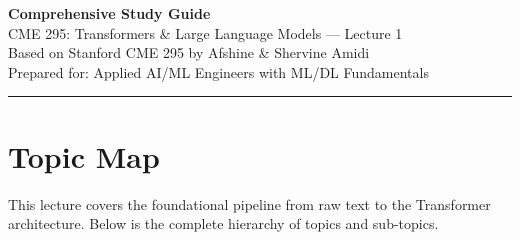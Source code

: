 \documentclass[11pt, a4paper]{article}
\begin{document}
\begin{center}
{\LARGE\bfseries\color{defblue} Comprehensive Study Guide}\\[6pt]
{\Large CME 295: Transformers \& Large Language Models --- Lecture 1}\\[4pt]
{\normalsize Based on Stanford CME 295 by Afshine \& Shervine Amidi}\\[4pt]
{\small Prepared for: Applied AI/ML Engineers with ML/DL Fundamentals}\\[2pt]
\rule{\textwidth}{0.4pt}
\end{center}

\tableofcontents
\newpage

\section{Topic Map}

This lecture covers the foundational pipeline from raw text to the Transformer architecture. Below is the complete hierarchy of topics and sub-topics.
\end{document}
